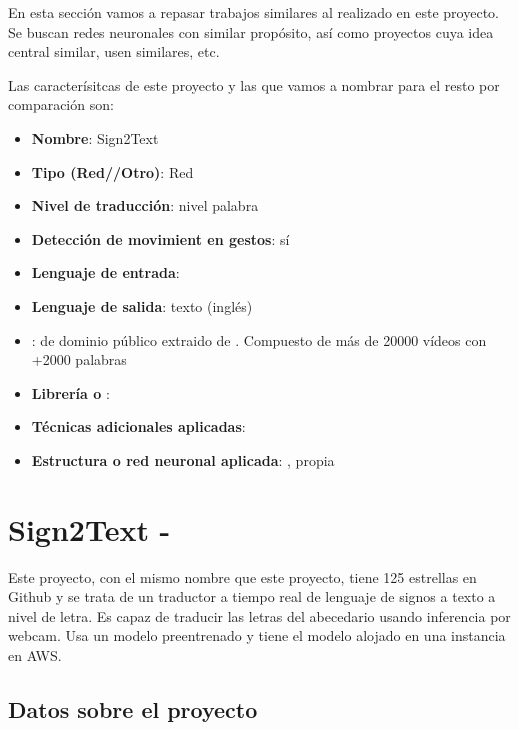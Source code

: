 
En esta sección vamos a repasar trabajos similares al realizado en este proyecto. Se buscan redes neuronales con similar propósito, así como proyectos cuya idea central similar, usen  similares, etc.

Las caracterísitcas de este proyecto y las que vamos a nombrar para el resto por comparación son:

\begin{itemize}
  \item \textbf{Nombre}: Sign2Text
  \item \textbf{Tipo (Red//Otro)}: Red
  \item \textbf{Nivel de traducción}: nivel palabra
  \item \textbf{Detección de movimient en gestos}: sí
  \item \textbf{Lenguaje de entrada}: 
  \item \textbf{Lenguaje de salida}: texto (inglés)
  \item \textbf{}:  de dominio público extraido de . Compuesto de más de 20000 vídeos con +2000 palabras
  \item \textbf{Librería o }: 
  \item \textbf{Técnicas adicionales aplicadas}: 
  \item \textbf{Estructura o red neuronal aplicada}: , propia
\end{itemize}

\section{Sign2Text - }

Este proyecto, con el mismo nombre que este proyecto, tiene 125 estrellas en Github y se trata de un traductor a tiempo real de lenguaje de signos  a texto a nivel de letra. Es capaz de traducir las letras del abecedario usando inferencia por webcam. Usa un modelo preentrenado  y tiene el modelo alojado en una instancia en AWS.

\subsection{Datos sobre el proyecto}


